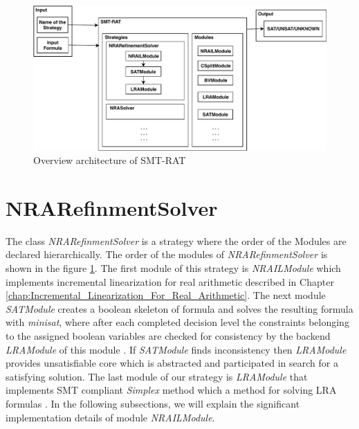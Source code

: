 \begin{figure}[ht!]
  \centering
  \includegraphics[width=.9\linewidth]{./figures/smtrat-arch.pdf}
  \caption{Overview architecture of SMT-RAT}
  \label{fig:overview_architecture_SMT-RAT}
\end{figure}


\section{NRARefinmentSolver}
\label{sec:nrarefinmentsolver}
\begin{sloppypar}
The class \textit{NRARefinmentSolver} is a strategy where the order of the Modules are declared hierarchically.
The order of the modules of \textit{NRARefinmentSolver} is shown in the figure \ref{fig:overview_architecture_SMT-RAT}.
The first module of this strategy is \textit{NRAILModule} which implements incremental linearization for real arithmetic described in Chapter \ref{chap:Incremental_Linearization_For_Real_Arithmetic}.
The next module \textit{SATModule} creates a boolean skeleton of formula and solves the resulting formula with \textit{minisat}, where after each completed decision level the constraints belonging to the assigned boolean variables are checked for consistency by the backend \textit{LRAModule} of this module \cite{inproceedings}.
If \textit{SATModule} finds inconsistency then \textit{LRAModule} provides unsatisfiable core which is abstracted and participated in search for a satisfying solution.
The last module of our strategy is \textit{LRAModule} that implements SMT compliant \textit{Simplex} method which a method for solving LRA formulas \cite{inproceedings}.
In the following subsections, we will explain the significant implementation details of module \textit{NRAILModule}.
\end{sloppypar}

